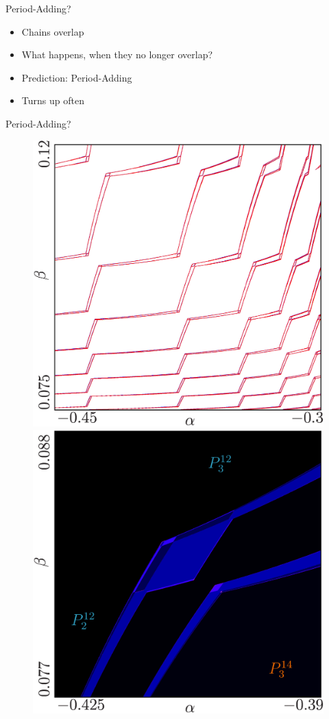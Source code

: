 \begin{frame}{Period-Adding?}
	\vspace{-1em}
	\begin{itemize}
		\item Chains overlap
		\item What happens, when they no longer overlap?
		      \vspace{1em}
		\item Prediction: Period-Adding
		\item Turns up often
	\end{itemize}
\end{frame}

\begin{frame}{Period-Adding?}
	\begin{figure}
		\includegraphics[width=.4 \textwidth]{Figs/archetypal_model_regions_drifting_apart.png}
		\quad
		\includegraphics[width=.4 \textwidth]{Figs/archetypal_model_adding_like_period_corner.png}
	\end{figure}
\end{frame}

